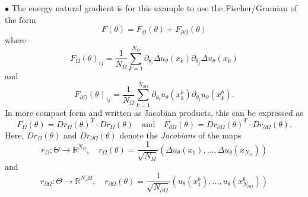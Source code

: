 \documentclass[11pt]{article}
\theoremstyle{definition}
\theoremstyle{plain}
\begin{document}
$\bullet$ The energy natural gradient is for this example to use the Fischer/Gramian of the form
\begin{equation*}
  F(\theta) = F_\Omega(\theta) + F_{\partial\Omega}(\theta)
\end{equation*}
where
\begin{equation}\label{eq:FisherInterior}
  F_\Omega(\theta)_{ij} = \frac1{{N_\Omega}} \sum_{k=1}^{N_\Omega} \partial_{\theta_i} \Delta u_\theta(x_k) \partial_{\theta_j} \Delta u_\theta(x_k)
\end{equation}
and
\begin{equation}
  F_{\partial\Omega}(\theta)_{ij} = \frac1{{N_\Omega}} \sum_{k=1}^{N_{\partial\Omega}} \partial_{\theta_i} u_\theta(x_k^b) \partial_{\theta_j} u_\theta (x_k^b).
\end{equation}
In more compact form and written as Jacobian products, this can be expressed as
\begin{equation}\label{eq:Jacobian_Fischer}
  F_\Omega(\theta) = Dr_\Omega(\theta)^T \cdot Dr_\Omega(\theta)
  \quad \text{and} \quad
  F_{\partial\Omega}(\theta) = Dr_{\partial\Omega}(\theta)^T \cdot Dr_{\partial\Omega}(\theta).
\end{equation}
Here, $Dr_\Omega(\theta)$ and $Dr_{\partial\Omega}(\theta)$  denote the \emph{Jacobians} of the maps
\begin{equation*}
  r_{\Omega}: \Theta \to \mathbb{R}^{N_\Omega}, \quad r_{\Omega}(\theta) = \frac{1}{\sqrt{N_{\Omega}}}(\Delta u_\theta(x_1), \dots, \Delta u_\theta(x_{N_{\Omega}}))
\end{equation*}
and
\begin{equation*}
  r_{\partial\Omega}: \Theta \to \mathbb{R}^{N_\partial\Omega}, \quad r_{\partial\Omega}(\theta) = \frac{1}{\sqrt{N_{\partial\Omega}}}(u_\theta(x^b_1), \dots, u_\theta(x^b_{N_{\partial\Omega}}))
\end{equation*}
\end{document}
